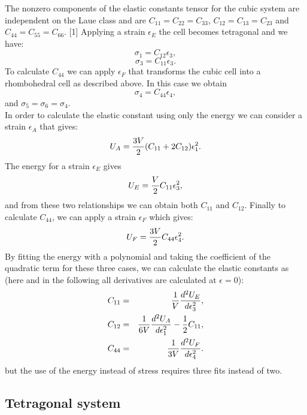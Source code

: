 \documentclass[12pt,a4paper,twoside]{report}
\begin{document}
The nonzero components of the elastic constants tensor for the cubic system
are independent on the Laue class and are $C_{11}=C_{22}=C_{33}$,
$C_{12}=C_{13}=C_{23}$ and $C_{44}=C_{55}=C_{66}$. [1]
Applying a strain $\epsilon_E$ the cell becomes tetragonal and we have:
\begin{equation}
\sigma_{1} = C_{12} \epsilon_3,
\end{equation}
\begin{equation}
\sigma_{3} = C_{11} \epsilon_3.
\end{equation}
To calculate $C_{44}$ we can apply $\epsilon_F$ that
transforms the cubic cell into a rhombohedral cell as described above. In
this case we obtain
\begin{equation}
\sigma_{4} = C_{44} \epsilon_4,
\end{equation}
and $\sigma_{5} = \sigma_{6} = \sigma_{4}$. \\
In order to calculate the elastic constant using only the energy
we can consider a strain $\epsilon_A$ that gives:
\begin{equation}
U_A = {3 V \over 2} (C_{11} + 2C_{12}) \epsilon_1^2.
\end{equation}
The energy for a strain $\epsilon_E$ gives
\begin{equation}
U_E = {V \over 2} C_{11} \epsilon_3^2,
\end{equation}
and from these two relationships we can obtain both $C_{11}$ and $C_{12}$.
Finally to calculate $C_{44}$, we can apply a strain $\epsilon_F$ 
which gives:
\begin{equation}
U_F = {3 V \over 2} C_{44} \epsilon_4^2.
\end{equation}
By fitting the energy with a polynomial and taking the coefficient of
the quadratic term for these three cases, we can calculate the elastic 
constants as (here and in the following all derivatives are calculated
at $\epsilon=0$):
\begin{eqnarray}
C_{11}&=&{1 \over V} {d^2 U_E \over d \epsilon_3^2}, \\ 
C_{12}&=&{1 \over 6 V} {d^2 U_A \over d \epsilon_1^2}  - {1\over 2} C_{11}, \\
C_{44}&=&{1 \over 3 V} {d^2 U_F \over d \epsilon_4^2}.
\end{eqnarray}
but the use of the energy instead of stress requires three fits instead
of two. 

{\color{web-blue}\subsection{Tetragonal system}}
\color{black}
\end{document}
